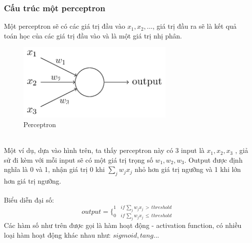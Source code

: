 \subsubsection{Cấu trúc một perceptron}
Một perceptron sẽ có các giá trị đầu vào $x_1, x_2, ...$, giá trị đầu ra sẽ 
là kết quả toán học của các giá trị đầu vào và là một giá trị nhị phân.\\
\begin{figure}[h!]
\centering
\includegraphics[height=1.5in, keepaspectratio=true]{perceptron_n.png}
\caption{Perceptron}
\end{figure}\\
Một ví dụ, dựa vào hình trên, ta thấy perceptron này có 3 input là 
$x_1, x_2, x_3$ , giả sử đi kèm với mỗi input sẽ có một giá trị trọng 
số $w_1, w_2, w_3$. Output được định nghĩa là 0 và 1, nhận giá trị 0 
khi $\sum_j w_j x_j$ nhỏ hơn giá trị ngưỡng và 1 khi lớn hơn giá trị ngưỡng.\\\\
Biểu diễn đại số:\\
\[
  output = 
  \bigg\{
    _{0 \quad if \, \sum_j w_j x_j \, \leq \, threshold}
    ^{1 \quad if \, \sum_j w_j x_j \, > \, threshold}
\]
Các hàm số như trên được gọi là hàm hoạt động - activation function, có nhiều 
loại hàm hoạt động khác nhau như: $sigmoid , tang ...$
